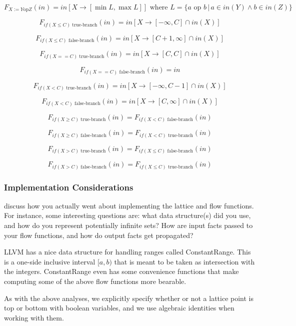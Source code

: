 \documentclass{article}
\theoremstyle{definition}
\begin{document}
\[ F_{X:= Y \text{op} Z}(in) = in[X \rightarrow [\min L, \max L]]\text{ where } L = \{ a \text{ op } b \, | \, a \in in(Y) \wedge b \in in(Z)  \}\]

\[ F_{if( X \leq C) \text{ true-branch}}(in) = in[X \rightarrow [-\infty, C] \cap in(X)  ] \]

\[ F_{if( X \leq C) \text{ false-branch}}(in) = in[X \rightarrow [C + 1, \infty] \cap in(X)  ]\]

\[ F_{if( X == C) \text{ true-branch}}(in) = in[X \rightarrow [C, C] \cap in(X)  ]\]

\[ F_{if( X == C) \text{ false-branch}}(in) = in \]

\[ F_{if( X < C) \text{ true-branch}}(in) =in[X \rightarrow [-\infty, C -1] \cap in(X)  ] \]

\[ F_{if( X < C) \text{ false-branch}}(in) =  in[X \rightarrow [C, \infty] \cap in(X)  ]\]

\[ F_{if( X \geq C) \text{ true-branch}}(in) =  F_{if( X < C) \text{ false-branch}}(in) \]

\[ F_{if( X \geq C) \text{ false-branch}}(in) =  F_{if( X < C) \text{ true-branch}}(in)\]

\[ F_{if( X > C) \text{ true-branch}}(in) =   F_{if( X \leq C) \text{ false-branch}}(in)\]

\[ F_{if( X > C) \text{ false-branch}}(in) =   F_{if( X \leq C) \text{ true-branch}}(in)\]


\subsubsection{Implementation Considerations}
\begin{framed}
  discuss how you actually went about implementing the lattice and
  flow functions. For instance, some interesting questions are: what
  data structure(s) did you use, and how do you represent potentially
  infinite sets? How are input facts passed to your flow functions,
  and how do output facts get propagated?
\end{framed}

LLVM has a nice data structure for handling ranges called ConstantRange. This is a one-side inclusive interval $[a, b)$ that is meant to be taken as intersection with the integers. ConstantRange even has some convenience functions that make computing some of the above flow functions more bearable. 

As with the above analyses, we explicitly specify whether or not a lattice point is top or bottom with boolean variables, and we use algebraic identities when working with them. 
\end{document}
